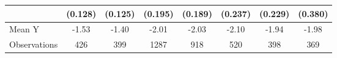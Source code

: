 {\begin{tabular}{l*{7}{c}}
            &     (0.128)         &     (0.125)         &     (0.195)         &     (0.189)         &     (0.237)         &     (0.229)         &     (0.380)         \\
\midrule
Mean Y      &       -1.53         &       -1.40         &       -2.01         &       -2.03         &       -2.10         &       -1.94         &       -1.98         \\
Observations&         426         &         399         &        1287         &         918         &         520         &         398         &         369         \\
\bottomrule
\end{tabular}
}
